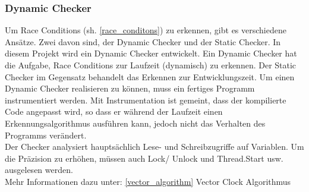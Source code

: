 \documentclass[10pt,a4paper]{article}
\begin{document}
\subsubsection{Dynamic Checker}
Um Race Conditions (sh. \ref{race_conditons}) zu erkennen, gibt es verschiedene Ansätze. Zwei davon sind, der Dynamic Checker und der Static Checker. In diesem Projekt
wird ein Dynamic Checker entwickelt. Ein Dynamic Checker hat die Aufgabe, Race Conditions zur Laufzeit (dynamisch) zu erkennen. Der Static Checker
im Gegensatz behandelt das Erkennen zur Entwicklungszeit. Um einen Dynamic Checker realisieren zu können, muss ein fertiges Programm instrumentiert werden.
Mit Instrumentation ist gemeint, dass der kompilierte Code angepasst wird, so dass er während der Laufzeit einen Erkennungsalgorithmus ausführen kann, jedoch nicht das Verhalten des Programms verändert.\\
Der Checker analysiert hauptsächlich Lese- und Schreibzugriffe auf Variablen. Um die Präzision zu erhöhen, müssen auch Lock/ Unlock und Thread.Start usw. ausgelesen werden.\\
Mehr Informationen dazu unter: \ref{vector_algorithm} Vector Clock Algorithmus
\end{document}
